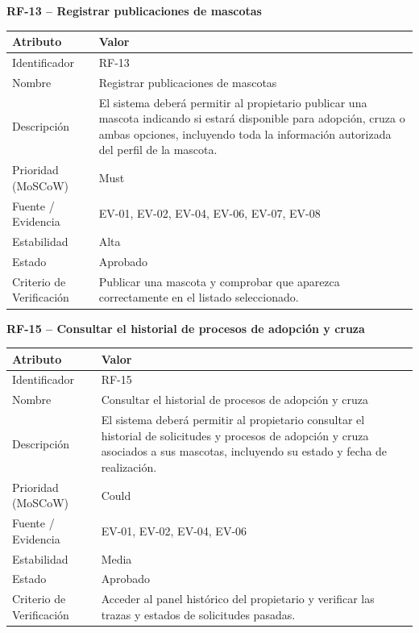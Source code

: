 \documentclass[journal,onecolumn]{IEEEtran}
\begin{document}
	\textbf{RF-13 -- Registrar publicaciones de mascotas}
	\begin{table}[H]
		\centering\small
		\begin{tabularx}{\linewidth}{|l|X|}
			\hline
			\textbf{Atributo} & \textbf{Valor} \\ \hline
			Identificador & RF-13 \\ \hline
			Nombre & Registrar publicaciones de mascotas \\ \hline
			Descripción & El sistema deberá permitir al propietario publicar una mascota indicando si estará disponible para adopción, cruza o ambas opciones, incluyendo toda la información autorizada del perfil de la mascota. \\ \hline
			Prioridad (MoSCoW) & Must \\ \hline
			Fuente / Evidencia & EV-01, EV-02, EV-04, EV-06, EV-07, EV-08 \\ \hline
			Estabilidad & Alta \\ \hline
			Estado & Aprobado \\ \hline
			Criterio de Verificación & Publicar una mascota y comprobar que aparezca correctamente en el listado seleccionado. \\ \hline
		\end{tabularx}
	\end{table}
	
	\textbf{RF-15 -- Consultar el historial de procesos de adopción y cruza}
	\begin{table}[H]
		\centering\small
		\begin{tabularx}{\linewidth}{|l|X|}
			\hline
			\textbf{Atributo} & \textbf{Valor} \\ \hline
			Identificador & RF-15 \\ \hline
			Nombre & Consultar el historial de procesos de adopción y cruza \\ \hline
			Descripción & El sistema deberá permitir al propietario consultar el historial de solicitudes y procesos de adopción y cruza asociados a sus mascotas, incluyendo su estado y fecha de realización. \\ \hline
			Prioridad (MoSCoW) & Could \\ \hline
			Fuente / Evidencia & EV-01, EV-02, EV-04, EV-06 \\ \hline
			Estabilidad & Media \\ \hline
			Estado & Aprobado \\ \hline
			Criterio de Verificación & Acceder al panel histórico del propietario y verificar las trazas y estados de solicitudes pasadas. \\ \hline
		\end{tabularx}
	\end{table}
	
\end{document}
